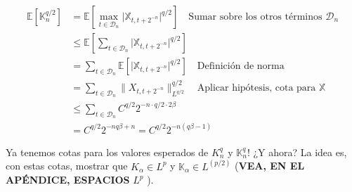 \begin{align*}
	\mathbb{E}[ \mathbb{K}_n^{q/2} ] &= \mathbb{E}[ \max_{t \in \mathcal{D}_n} \lvert \mathbb{X}_{t, t + 2^{-n}}  \rvert^{q/2} ] \quad \text{Sumar sobre los otros términos } \mathcal{D}_n \\
	&\leq \mathbb{E}\left[ \sum_{t \in \mathcal{D}_n}  \lvert \mathbb{X}_{t, t + 2^{-n}} \rvert^{q/2} \right] \\
	&= \sum_{t \in \mathcal{D}_n} \mathbb{E} [\lvert \mathbb{X}_{t, t + 2^{-n}} \rvert^{q/2}] \quad \text{Definición de norma} \\
	&= \sum_{t \in \mathcal{D}_n} \lVert X_{t, t + 2^{-n}} \rVert_ {L^{q/2}}^{q/2} \quad \text{Aplicar hipótesis, cota para } \mathbb{X} \\
	&\leq \sum_{t \in \mathcal{D}_n} C^{q/2} 2^{-n \cdot q/2 \cdot 2\beta} \\
	&= C^{q/2} 2^{-nq\beta + n} = C^{q/2} 2^{-n(q \beta - 1 )}
\end{align*}


Ya tenemos cotas para los valores esperados de $K_n^q$ y $\mathbb{K}_n^q$! ¿Y ahora? La idea es, con estas cotas, mostrar que $K_{\alpha} \in L^p$ y $\mathbb{K}_{\alpha} \in L^(p/2)$ (\textbf{VEA, EN EL APÉNDICE, ESPACIOS} $L^p$ ).



\begin{comment}

Fije $s < t$ en $\cup_{n \leq 0} \mathcal{D}_n$ (La unión de todos los elementos en la partición diádica, esto es, $t = \frac{k}{2^n}$ para algún $k, n$). Seleccione $m$, de tal forma que $2^{-(m+1)} < t - s < 2^{-m} $. 

Note que, $[s,t]$ se puede expresar como la unión finita de intervalos de la forma $[u, v] \in \mathcal{D}_n$, con $n > m + 1$ donde no hay tres intervalos con el mismo tamaño. (Creo que ya entendí :D... ). Dicho de otra forma, tenemos una partición de $[s, t]$ de la forma

\[
	s = u_0 < u_1 < \cdots < u_N = t
\]

donde $[u_i, u_{i+1}] \in \mathcal{D}_n$ para algún $n > m + 1$, y para cada $n \geq m + 1$, hay a lo sumo, dos intervalos tomados de $\mathcal{D_n}$. Argumento de descomposición multiescala: Argumento de encadenamiento.

\[
	\lvert X_{s,t} \rvert \leq \max_{0 \leq i < N} \lvert X_{s, u_{i+1} } \rvert \leq \sum_{i = 0}^{N-1} \lvert X_{u_i, u_{i+1} } \rvert \leq 2 \sum_{n = m+1}^{\infty} K_n
\]

\end{comment}

